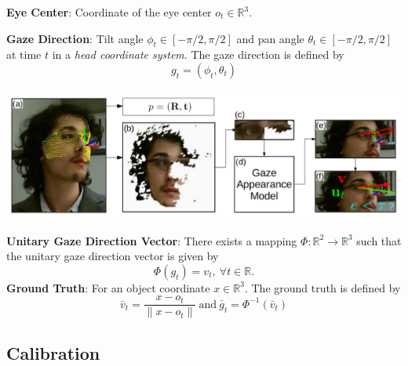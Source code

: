 \documentclass{beamer}
\begin{document}
\begin{frame}
\textbf{Eye Center}: \newline
Coordinate of the eye center $o_t \in \mathbb{R}^3$.
\vspace{0.5cm}

\textbf{Gaze Direction}: \newline 
Tilt angle $\phi_t \in [-\pi/2,\pi/2]$ and pan angle $\theta_t \in [-\pi/2,\pi/2]$ at time $t$ in a \textit{head coordinate system}. The gaze direction is defined by 
\begin{equation}
g_t = (\phi_t,\theta_t)
\end{equation}
\begin{center}
\includegraphics[scale=0.4]{Pictures/HG3D.png}
\end{center}
\end{frame}

\begin{frame}
\textbf{Unitary Gaze Direction Vector}: \newline
There exists a mapping $\Phi: \mathbb{R}^2 \rightarrow \mathbb{R}^3$ such that the unitary gaze direction vector is given by
\begin{equation}
\Phi(g_t) = v_t,~\forall t \in \mathbb{R}.
\end{equation}
\textbf{Ground Truth}: \newline
For an object coordinate $x \in \mathbb{R}^3$. The ground truth is defined by 
\begin{equation}
\bar{v}_t = \frac{x-o_t}{\|x-o_t\|}~\text{and}~\bar{g}_t = \Phi^{-1}(\bar{v}_t)
\end{equation}
\end{frame}

\subsection{Calibration}
\end{document}
